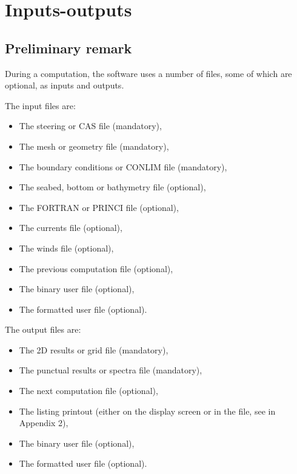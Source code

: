 \chapter{ Inputs-outputs}

\section{ Preliminary remark}

 During a computation, the \tomawac software uses a number of files, some of which are optional, as inputs and outputs.

 The input files are:

\begin{itemize}
\item  The steering or CAS file (mandatory),

\item  The mesh or geometry file (mandatory),

\item  The boundary conditions or CONLIM file (mandatory),

\item  The seabed, bottom or bathymetry file (optional),

\item  The FORTRAN or PRINCI file (optional),

\item  The currents file (optional),

\item  The winds file (optional),

\item  The previous computation file (optional),

\item  The binary user file (optional),

\item  The formatted user file (optional).
\end{itemize}

The output files are:

\begin{itemize}
\item  The 2D results or grid file (mandatory),

\item  The punctual results or spectra file (mandatory),

\item  The next computation file (optional),

\item  The listing printout (either on the display screen or in the file, see in Appendix 2),

\item  The binary user file (optional),

\item  The formatted user file (optional).
\end{itemize}


